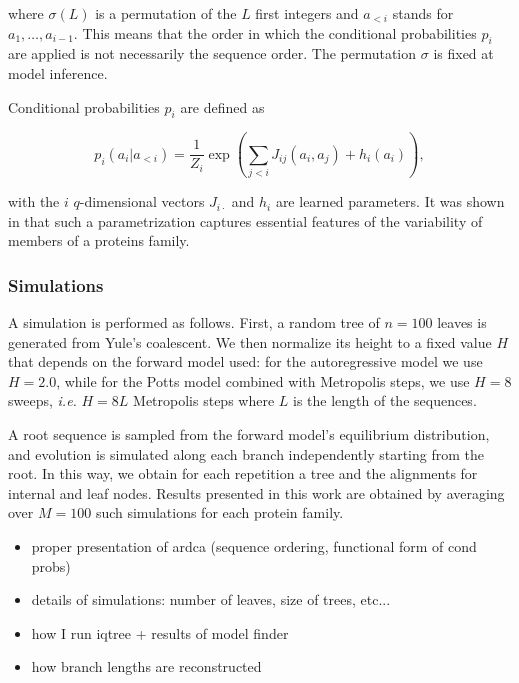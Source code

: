 where $\sigma(L)$ is a permutation of the $L$ first integers and $a_{<i}$ stands for $a_1, \ldots, a_{i-1}$. 
This means that the order in which the conditional probabilities $p_i$ are applied is not necessarily the sequence order. 
The permutation $\sigma$ is fixed at model inference. 

Conditional probabilities $p_i$ are defined as

\begin{equation}
	p_i(a_i \vert a_{<i}) = \frac{1}{Z_i}\exp\left( \sum_{j < i} J_{ij}(a_i, a_j) + h_i(a_i) \right),
\end{equation}

with the $i$ $q$-dimensional vectors $J_{i\cdot}$ and $h_i$ are learned parameters. 
It was shown in \cite{trinquier_efficientgenerativemodeling_2021} that such a parametrization captures essential features of the variability of members of a proteins family. 

\subsubsection{Simulations}

A simulation is performed as follows. 
First, a random tree of $n=100$ leaves is generated from Yule's coalescent. 
We then normalize its height to a fixed value $H$ that depends on the forward model used: for the autoregressive model we use $H=2.0$, while for the Potts model combined with Metropolis steps, we use $H=8$ sweeps, \emph{i.e.} $H=8 L$ Metropolis steps where $L$ is the length of the sequences. 

A root sequence is sampled from the forward model's equilibrium distribution, and evolution is simulated along each branch independently starting from the root. 
In this way, we obtain for each repetition a tree and the alignments for internal and leaf nodes. 
Results presented in this work are obtained by averaging over $M=100$ such simulations for each protein family. 

\begin{itemize}
	\item proper presentation of ardca (sequence ordering, functional form of cond probs)
	\item details of simulations: number of leaves, size of trees, etc...
	\item how I run iqtree + results of model finder
	\item how branch lengths are reconstructed 
\end{itemize}

